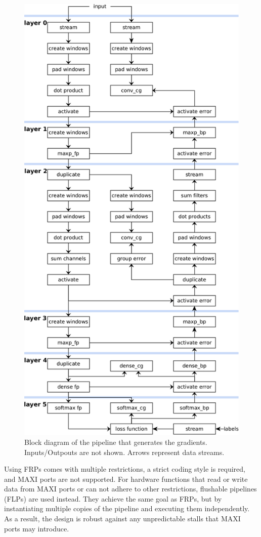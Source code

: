 \begin{figure}[H]
    \centering
        \includegraphics[height=0.95\textheight]{Images/block_diagrams/process_batch.png}
        \decoRule
        \caption[Gradients Calculation Pipeline Block Diagram]{Block diagram of the pipeline that generates the gradients. Inputs/Outpouts are not shown. Arrows represent data streams.}
        \label{fig: Gradients Calculation Pipeline Block Diagram}
\end{figure}
Using FRPs comes with multiple restrictions, a strict coding style is required, and MAXI ports are not supported. For hardware functions that read or write data from MAXI ports or can not adhere to other restrictions, flushable pipelines (FLPs) are used instead. They achieve the same goal as FRPs, but by instantiating multiple copies of the pipeline and executing them independently. As a result, the design is robust against any unpredictable stalls that MAXI ports may introduce. %

